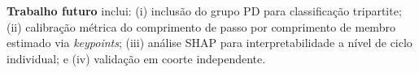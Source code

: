\documentclass[a4paper,12pt]{article}
\begin{document}
\noindent\textbf{Trabalho futuro} inclui: (i) inclusão do grupo PD para
classificação tripartite; (ii) calibração métrica do comprimento de passo por
comprimento de membro estimado via \textit{keypoints}; (iii) análise SHAP para
interpretabilidade a nível de ciclo individual; e (iv) validação em coorte
independente.



\end{document}
